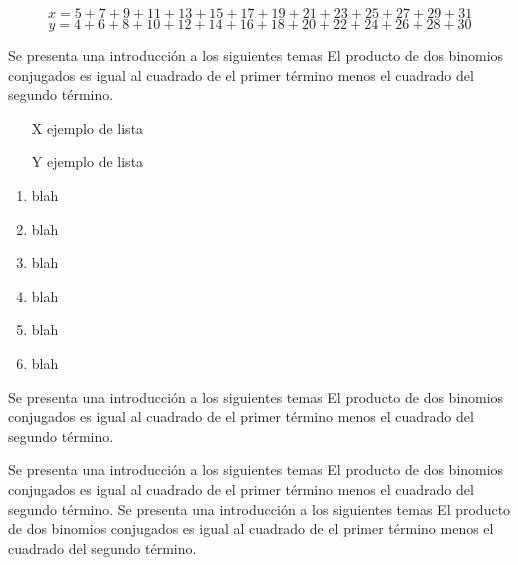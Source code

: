 \documentclass[journal]{IEEEtran}
\begin{document}
\begin{figure}[!t]
\normalsize
\begin{equation}
\label{eqn_dbl_x}
x = 5 + 7 + 9 + 11 + 13 + 15 + 17 + 19 + 21+ 23 + 25
+ 27 + 29 + 31
\end{equation}
\begin{equation}
\label{eqn_dbl_y}
y = 4 + 6 + 8 + 10 + 12 + 14 + 16 + 18 + 20+ 22 + 24
+ 26 + 28 + 30
\end{equation}
\setcounter{equation}{\value{MYtempeqncnt}}
\hrulefill
\vspace*{4pt}
\end{figure}
Se presenta una introducción a los siguientes temas El producto de dos binomios conjugados es igual al cuadrado de el primer término menos el cuadrado del segundo término.
\begin{itemize}[]
\item[X] ejemplo de lista
\item[Y] ejemplo de lista
\end{itemize}
\begin{enumerate}[\IEEEsetlabelwidth{12)}]
\item blah
\item blah
\item blah
\item blah
\item blah
\item blah
\end{enumerate}
\renewcommand{\IEEEproofname}{Demostración}
\begin{IEEEproof}
Se presenta una introducción a los siguientes temas El producto de dos binomios conjugados es igual al cuadrado de el primer término menos el cuadrado del segundo término.
\end{IEEEproof}
Se presenta una introducción a los siguientes temas El producto de dos binomios conjugados es igual al cuadrado de el primer término menos el cuadrado del segundo término.
Se presenta una introducción a los siguientes temas El producto de dos binomios conjugados es igual al cuadrado de el primer término menos el cuadrado del segundo término.
\end{document}

